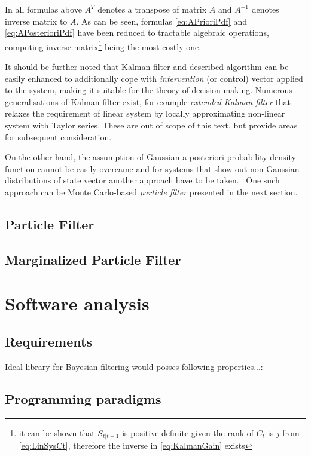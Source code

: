 \documentclass[a4paper,12pt,oneside]{report}
\newcommand{\pdf}{probability density function}
\begin{document}
In all formulas above \(A^T\) denotes a transpose of matrix \(A\) and \(A^{-1}\) denotes inverse
matrix to \(A\). As can be seen, formulas \eqref{eq:APrioriPdf} and \eqref{eq:APosterioriPdf} have
been reduced to tractable algebraic operations, computing inverse matrix\footnote{it can be shown
that \(S_{t|t-1}\) is positive definite given the rank of \(C_t\) is \(j\) from \eqref{eq:LinSysCt},
therefore the inverse in \eqref{eq:KalmanGain} exists} being the most costly one.

It should be further noted that Kalman filter and described algorithm can be easily enhanced to
additionally cope with \emph{intervention} (or control) vector applied to the system, making it
suitable for the theory of decision-making. Numerous generalisations of Kalman filter exist, for
example \emph{extended Kalman filter} that relaxes the requirement of linear system by locally
approximating non-linear system with Taylor series. These are out of scope of this
text, but provide areas for subsequent consideration.

On the other hand, the assumption of Gaussian a posteriori {\pdf} cannot be easily overcame and for
systems that show out non-Gaussian distributions of state vector another approach have to be
taken.~\cite{AruMasGor:02} One such approach can be Monte Carlo-based \emph{particle filter}
presented in the next section.

\section{Particle Filter}

\section{Marginalized Particle Filter}


\chapter{Software analysis}

\section{Requirements}

Ideal library for Bayesian filtering would posses following properties...:

\section{Programming paradigms}
\end{document}
